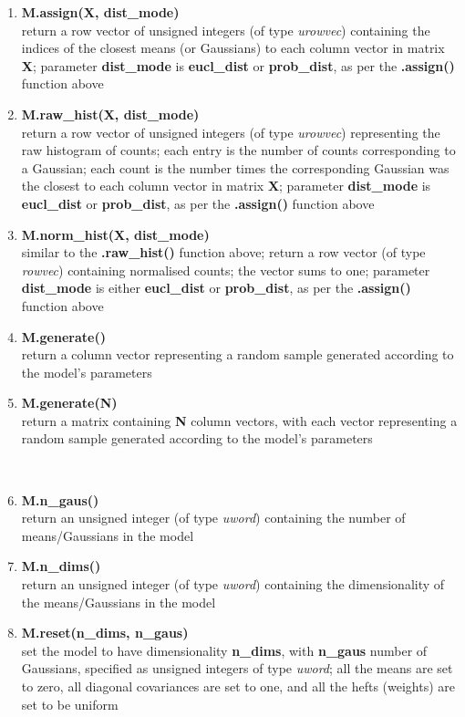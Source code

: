 \begin{enumerate}[{$\bullet$}]
\item
{\bf M.assign(X, dist\_mode)}\\
return a row vector of unsigned integers (of type {\it urowvec}) containing the indices of the closest means (or Gaussians) to each column vector in matrix {\bf X};
parameter {\bf dist\_mode} is {\bf eucl\_dist} or {\bf prob\_dist}, as per the {\bf .assign()} function above

\item
{\bf M.raw\_hist(X, dist\_mode)}\\
return a row vector of unsigned integers (of type {\it urowvec}) representing the raw histogram of counts;
each entry is the number of counts corresponding to a Gaussian;
each count is the number times the corresponding Gaussian was the closest to each column vector in matrix {\bf X};
parameter {\bf dist\_mode} is {\bf eucl\_dist} or {\bf prob\_dist}, as per the {\bf .assign()} function above

\item
{\bf M.norm\_hist(X, dist\_mode)}\\
similar to the {\bf .raw\_hist()} function above; return a row vector (of type {\it rowvec}) containing normalised counts; the vector sums to one;
parameter {\bf dist\_mode} is either {\bf eucl\_dist} or {\bf prob\_dist}, as per the {\bf .assign()} function above

\item
{\bf M.generate()}\\
return a column vector representing a random sample generated according to the model's parameters

\item
{\bf M.generate(N)}\\
return a matrix containing {\bf N} column vectors, with each vector representing a random sample generated according to the model's parameters

~\\
\item
{\bf M.n\_gaus()}\\
return an unsigned integer (of type {\it uword}) containing the number of means/Gaussians in the model

\item
{\bf M.n\_dims()}\\
return an unsigned integer (of type {\it uword}) containing the dimensionality of the means/Gaussians in the model

\item
{\bf M.reset(n\_dims, n\_gaus)}\\
set the model to have dimensionality {\bf n\_dims}, with {\bf n\_gaus} number of Gaussians, specified as unsigned integers of type {\it uword};
all the means are set to zero, all diagonal covariances are set to one, and all the hefts (weights) are set to be uniform


\end{enumerate}
